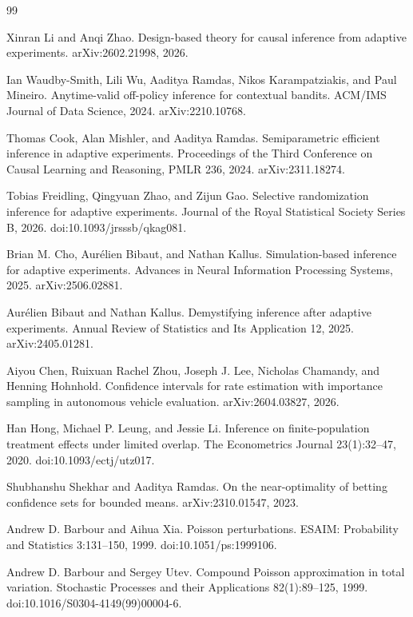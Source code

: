 \documentclass{article}
\begin{document}
\begin{thebibliography}{99}

   Xinran Li and Anqi Zhao. Design-based theory for causal inference from adaptive experiments. arXiv:2602.21998, 2026.

   Ian Waudby-Smith, Lili Wu, Aaditya Ramdas, Nikos Karampatziakis, and Paul Mineiro. Anytime-valid off-policy inference for contextual bandits. ACM/IMS Journal of Data Science, 2024. arXiv:2210.10768.

   Thomas Cook, Alan Mishler, and Aaditya Ramdas. Semiparametric efficient inference in adaptive experiments. Proceedings of the Third Conference on Causal Learning and Reasoning, PMLR 236, 2024. arXiv:2311.18274.

   Tobias Freidling, Qingyuan Zhao, and Zijun Gao. Selective randomization inference for adaptive experiments. Journal of the Royal Statistical Society Series B, 2026. doi:10.1093/jrsssb/qkag081.

   Brian M. Cho, Aurélien Bibaut, and Nathan Kallus. Simulation-based inference for adaptive experiments. Advances in Neural Information Processing Systems, 2025. arXiv:2506.02881.

   Aurélien Bibaut and Nathan Kallus. Demystifying inference after adaptive experiments. Annual Review of Statistics and Its Application 12, 2025. arXiv:2405.01281.

   Aiyou Chen, Ruixuan Rachel Zhou, Joseph J. Lee, Nicholas Chamandy, and Henning Hohnhold. Confidence intervals for rate estimation with importance sampling in autonomous vehicle evaluation. arXiv:2604.03827, 2026.

   Han Hong, Michael P. Leung, and Jessie Li. Inference on finite-population treatment effects under limited overlap. The Econometrics Journal 23(1):32--47, 2020. doi:10.1093/ectj/utz017.

   Shubhanshu Shekhar and Aaditya Ramdas. On the near-optimality of betting confidence sets for bounded means. arXiv:2310.01547, 2023.

   Andrew D. Barbour and Aihua Xia. Poisson perturbations. ESAIM: Probability and Statistics 3:131--150, 1999. doi:10.1051/ps:1999106.

   Andrew D. Barbour and Sergey Utev. Compound Poisson approximation in total variation. Stochastic Processes and their Applications 82(1):89--125, 1999. doi:10.1016/S0304-4149(99)00004-6.


\end{thebibliography}
\end{document}
